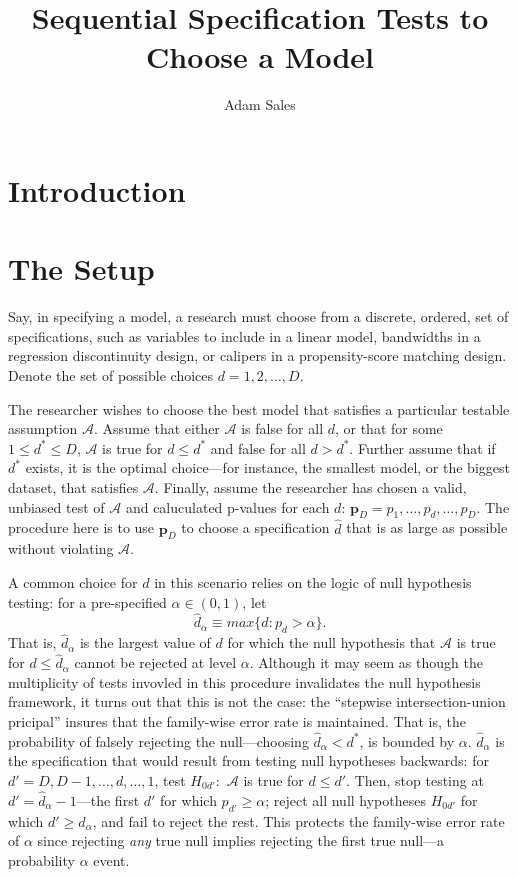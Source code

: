 \documentclass[12pt]{article}\usepackage[]{graphicx}\usepackage[]{color}
\title{Sequential Specification Tests to Choose a Model}
\author{Adam Sales}
\newcommand{\dalpha}{\hat{d}_\alpha}
\newcommand{\dstar}{d^*}
\begin{document}
\maketitle

\section{Introduction}

\section{The Setup}

Say, in specifying a model, a research must choose from a discrete,
ordered, set of specifications, such as variables to include in a
linear model, bandwidths in a regression discontinuity design, or
calipers in a propensity-score matching design.
Denote the set of possible choices $d=1,2,\dots,D$.

The researcher wishes to choose the best model that satisfies a
particular testable assumption $\mathcal{A}$.
Assume that either $\mathcal{A}$ is false for all $d$, or that for
some $1\le \dstar\le D$, $\mathcal{A}$ is true for $d\le \dstar$ and false
for all $d>\dstar$.
Further assume that if $\dstar$ exists, it is the optimal choice---for
instance, the smallest model, or the biggest dataset, that satisfies
$\mathcal{A}$.
Finally, assume the researcher has chosen a valid, unbiased test of
$\mathcal{A}$ and caluculated p-values for each $d$:
$\bm{p}_D=p_1,\dots,p_d,\dots,p_D$.
The procedure here is to use $\bm{p}_D$ to choose a specification
$\hat{d}$ that is as large as possible without violating
$\mathcal{A}$.


A common choice for $d$ in this scenario relies on the logic of null
hypothesis testing: for a pre-specified $\alpha \in (0,1)$, let
\begin{equation*}
\dalpha \equiv max\{d : p_d>\alpha\}.
\end{equation*}
That is, $\dalpha$ is the largest value of $d$ for which the
null hypothesis that $\mathcal{A}$ is true for $d\le \dalpha$
cannot be rejected at level $\alpha$.
Although it may seem as though the multiplicity of tests invovled in
this procedure invalidates the null hypothesis framework, it turns out
that this is not the case: the ``stepwise intersection-union
pricipal'' \citet{berger1988, rosenbaum2008,hansen2015} insures that the
family-wise error rate is maintained.
That is, the probability of falsely rejecting the null---choosing
$\dalpha<\dstar$, is bounded by $\alpha$.
$\dalpha$ is the specification that would result from testing null
hypotheses backwards: for $d'=D,D-1,\dots,d,\dots,1$, test $H_{0d'}:$
$\mathcal{A}$ is true for $d\le d'$.
Then, stop testing at $d'=\dalpha -1$---the first $d'$ for which
$p_{d'} \ge \alpha$; reject all null hypotheses $H_{0d'}$ for which
$d'\ge \dalpha$, and fail to reject the rest.
This protects the family-wise error rate of $\alpha$ since rejecting
\emph{any} true null implies rejecting the first true null---a
probability $\alpha$ event.
\end{document}
